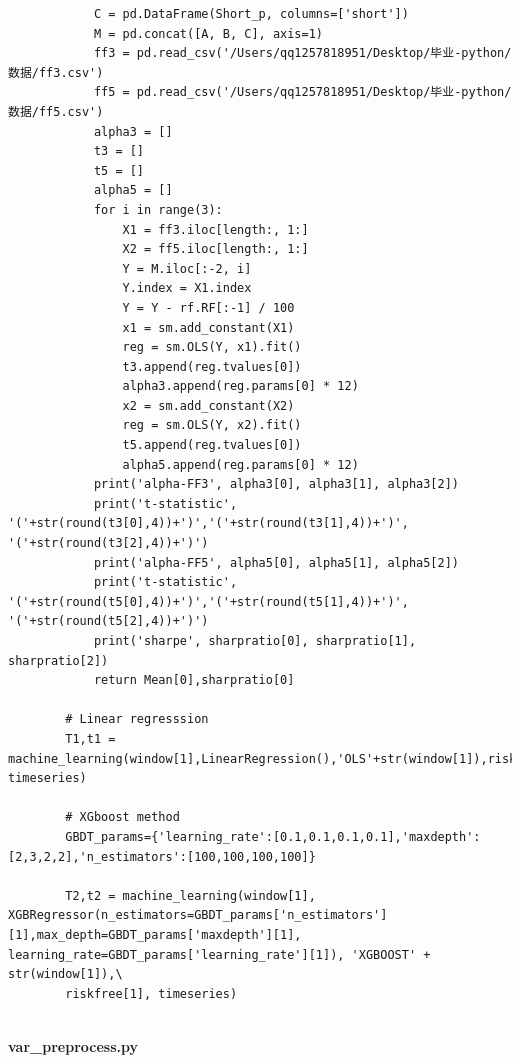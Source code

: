 \documentclass[12pt]{article} %
\begin{document}
\begin{lstlisting}
			C = pd.DataFrame(Short_p, columns=['short'])
			M = pd.concat([A, B, C], axis=1)
			ff3 = pd.read_csv('/Users/qq1257818951/Desktop/毕业-python/数据/ff3.csv')
			ff5 = pd.read_csv('/Users/qq1257818951/Desktop/毕业-python/数据/ff5.csv')
			alpha3 = []
			t3 = []
			t5 = []
			alpha5 = []
			for i in range(3):
				X1 = ff3.iloc[length:, 1:]
				X2 = ff5.iloc[length:, 1:]
				Y = M.iloc[:-2, i]
				Y.index = X1.index
				Y = Y - rf.RF[:-1] / 100
				x1 = sm.add_constant(X1)
				reg = sm.OLS(Y, x1).fit()
				t3.append(reg.tvalues[0])
				alpha3.append(reg.params[0] * 12)
				x2 = sm.add_constant(X2)
				reg = sm.OLS(Y, x2).fit()
				t5.append(reg.tvalues[0])
				alpha5.append(reg.params[0] * 12)
			print('alpha-FF3', alpha3[0], alpha3[1], alpha3[2])
			print('t-statistic', '('+str(round(t3[0],4))+')','('+str(round(t3[1],4))+')', '('+str(round(t3[2],4))+')')
			print('alpha-FF5', alpha5[0], alpha5[1], alpha5[2])
			print('t-statistic', '('+str(round(t5[0],4))+')','('+str(round(t5[1],4))+')', '('+str(round(t5[2],4))+')')
			print('sharpe', sharpratio[0], sharpratio[1], sharpratio[2])
			return Mean[0],sharpratio[0]
		
		# Linear regresssion
		T1,t1 = machine_learning(window[1],LinearRegression(),'OLS'+str(window[1]),riskfree[1], timeseries)
		
		# XGboost method
		GBDT_params={'learning_rate':[0.1,0.1,0.1,0.1],'maxdepth':[2,3,2,2],'n_estimators':[100,100,100,100]}
		
		T2,t2 = machine_learning(window[1], XGBRegressor(n_estimators=GBDT_params['n_estimators'][1],max_depth=GBDT_params['maxdepth'][1], learning_rate=GBDT_params['learning_rate'][1]), 'XGBOOST' + str(window[1]),\
		riskfree[1], timeseries)
	\end{lstlisting}
	~\\
	\textbf{var\_preprocess.py}
\end{document}
